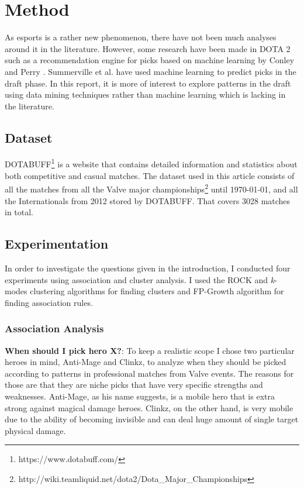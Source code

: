 \documentclass[report.tex]{subfiles}
\begin{document}
\section*{\centering Method}

As esports is a rather new phenomenon, there have not been much analyses around it in the literature. However, some research have been made in DOTA 2 such as a recommendation engine for picks based on machine learning by Conley and Perry \cite{conley2013does}. Summerville et al. \cite{cook2016draft} have used machine learning to predict picks in the draft phase. In this report, it is more of interest to explore patterns in the draft using data mining techniques rather than machine learning which is lacking in the literature.

\subsection*{Dataset}

DOTABUFF\footnote{https://www.dotabuff.com/} is a website that contains detailed information and statistics about both competitive and casual matches. The dataset used in this article consists of all the matches from all the Valve major championships\footnote{http://wiki.teamliquid.net/dota2/Dota\_Major\_Championships} until \today, and all the Internationals from 2012 stored by DOTABUFF. That covers 3028 matches in total.

\subsection*{Experimentation}

In order to investigate the questions given in the introduction, I conducted four experiments using association and cluster analysis. I used the ROCK and \textit{k}-modes clustering algorithms \cite{guha2000rock} for finding clusters and FP-Growth algorithm \cite{han2000mining} for finding association rules.

\subsubsection*{Association Analysis}

\textbf{When should I pick hero X?}: To keep a realistic scope I chose two particular heroes in mind, Anti-Mage and Clinkz, to analyze when they should be picked according to patterns in professional matches from Valve events. The reasons for those are that they are niche picks that have very specific strengths and weaknesses. Anti-Mage, as his name suggests, is a mobile hero that is extra strong against magical damage heroes. Clinkz, on the other hand, is very mobile due to the ability of becoming invisible and can deal huge amount of single target physical damage.
\end{document}
